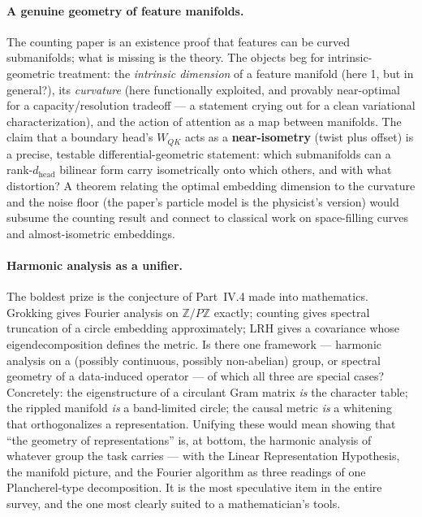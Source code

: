 \paragraph*{A genuine geometry of feature manifolds.}
The counting paper is an existence proof that features can be curved submanifolds; what is missing is the theory. The objects beg for intrinsic-geometric treatment: the \emph{intrinsic dimension} of a feature manifold (here 1, but in general?), its \emph{curvature} (here functionally exploited, and provably near-optimal for a capacity/resolution tradeoff --- a statement crying out for a clean variational characterization), and the action of attention as a map between manifolds. The claim that a boundary head's $W_{QK}$ acts as a \textbf{near-isometry} (twist plus offset) is a precise, testable differential-geometric statement: which submanifolds can a rank-$d_{\text{head}}$ bilinear form carry isometrically onto which others, and with what distortion? A theorem relating the optimal embedding dimension to the curvature and the noise floor (the paper's particle model is the physicist's version) would subsume the counting result and connect to classical work on space-filling curves and almost-isometric embeddings.

\paragraph*{Harmonic analysis as a unifier.}
The boldest prize is the conjecture of Part~IV.4 made into mathematics. Grokking gives Fourier analysis on $\mathbb{Z}/P\mathbb{Z}$ exactly; counting gives spectral truncation of a circle embedding approximately; LRH gives a covariance whose eigendecomposition defines the metric. Is there one framework --- harmonic analysis on a (possibly continuous, possibly non-abelian) group, or spectral geometry of a data-induced operator --- of which all three are special cases? Concretely: the eigenstructure of a circulant Gram matrix \emph{is} the character table; the rippled manifold \emph{is} a band-limited circle; the causal metric \emph{is} a whitening that orthogonalizes a representation. Unifying these would mean showing that ``the geometry of representations'' is, at bottom, the harmonic analysis of whatever group the task carries --- with the Linear Representation Hypothesis, the manifold picture, and the Fourier algorithm as three readings of one Plancherel-type decomposition. It is the most speculative item in the entire survey, and the one most clearly suited to a mathematician's tools.


\printbibliography

